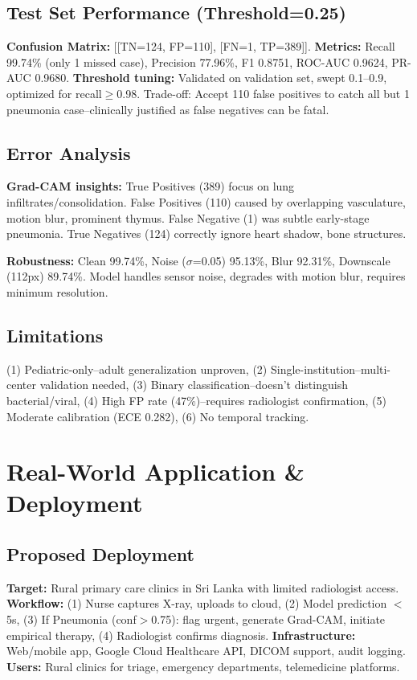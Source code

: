 \documentclass[12pt,a4paper]{article}
\begin{document}
\subsection{Test Set Performance (Threshold=0.25)}
\textbf{Confusion Matrix:} [[TN=124, FP=110], [FN=1, TP=389]]. \textbf{Metrics:} Recall 99.74\% (only 1 missed case), Precision 77.96\%, F1 0.8751, ROC-AUC 0.9624, PR-AUC 0.9680. \textbf{Threshold tuning:} Validated on validation set, swept 0.1--0.9, optimized for recall$\geq$0.98. Trade-off: Accept 110 false positives to catch all but 1 pneumonia case--clinically justified as false negatives can be fatal.

\subsection{Error Analysis}
\textbf{Grad-CAM insights:} True Positives (389) focus on lung infiltrates/consolidation. False Positives (110) caused by overlapping vasculature, motion blur, prominent thymus. False Negative (1) was subtle early-stage pneumonia. True Negatives (124) correctly ignore heart shadow, bone structures.

\textbf{Robustness:} Clean 99.74\%, Noise ($\sigma$=0.05) 95.13\%, Blur 92.31\%, Downscale (112px) 89.74\%. Model handles sensor noise, degrades with motion blur, requires minimum resolution.

\subsection{Limitations}
(1) Pediatric-only--adult generalization unproven, (2) Single-institution--multi-center validation needed, (3) Binary classification--doesn't distinguish bacterial/viral, (4) High FP rate (47\%)--requires radiologist confirmation, (5) Moderate calibration (ECE 0.282), (6) No temporal tracking.

\section{Real-World Application \& Deployment}

\subsection{Proposed Deployment}
\textbf{Target:} Rural primary care clinics in Sri Lanka with limited radiologist access. \textbf{Workflow:} (1) Nurse captures X-ray, uploads to cloud, (2) Model prediction $<$5s, (3) If Pneumonia (conf$>$0.75): flag urgent, generate Grad-CAM, initiate empirical therapy, (4) Radiologist confirms diagnosis. \textbf{Infrastructure:} Web/mobile app, Google Cloud Healthcare API, DICOM support, audit logging. \textbf{Users:} Rural clinics for triage, emergency departments, telemedicine platforms.
\end{document}
